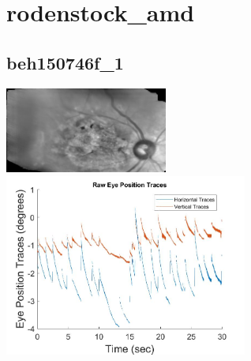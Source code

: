 \documentclass[11pt]{article}
\begin{document}
\section{rodenstock\_amd}

\subsection{beh150746f\_1}
\includegraphics[width=0.40\textwidth, valign=m]{referenceframes/rodenstock_amd/beh150746f_1_dwt_nostim_gamscaled_bandfilt_refframe.jpg}
\includegraphics[width=0.60\textwidth, valign=m]{eyepositiontraces/rodenstock_amd/beh150746f_1.jpg}\\
\end{document}
